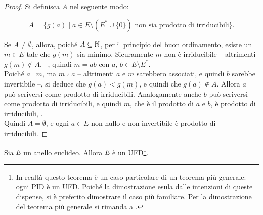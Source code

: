 \begin{proof}
    Si definisca $A$ nel seguente modo:

    \[A = \{g(a) \mid a \in E \setminus (E^* \cup \{0\}) \text{ non sia prodotto di irriducibili}\}.\]

    \vskip 0.1in

    Se $A \neq \emptyset$, allora, poiché $A \subseteq \mathbb N$, per il principio
    del buon ordinamento, esiste un $m \in E$ tale che $g(m)$ sia minimo.
    Sicuramente $m$ non è irriducibile -- altrimenti $g(m) \notin A$, \Lightning{} --,
    quindi $m=ab$ con $a$, $b \in E \setminus E^*$. \\

    Poiché $a \mid m$, ma $m \nmid a$ -- altrimenti $a$ e $m$ sarebbero
    associati, e quindi $b$ sarebbe invertibile --, si deduce che $g(a) < g(m)$, e
    quindi che $g(a) \notin A$. Allora $a$ può scriversi come prodotto di irriducibili.
    Analogamente anche $b$ può scriversi come prodotto di irriducibili, e quindi
    $m$, che è il prodotto di $a$ e $b$, è prodotto di irriducibili, \Lightning{}. \\

    Quindi $A = \emptyset$, e ogni $a \in E$ non nullo e non invertibile è prodotto
    di irriducibili.
\end{proof}

\begin{theorem}
    \label{th:euclidei_ufd}
    Sia $E$ un anello euclideo. Allora $E$ è un UFD\footnote{In realtà questo teorema
        è un caso particolare di un teorema più generale: ogni PID è un UFD. Poiché
        la dimostrazione esula dalle intenzioni di queste dispense, si è preferito
        dimostrare il caso più familiare. Per la dimostrazione del teorema più generale si
        rimanda a \cite[pp.~124-126]{di2013algebra}.}.
\end{theorem}

